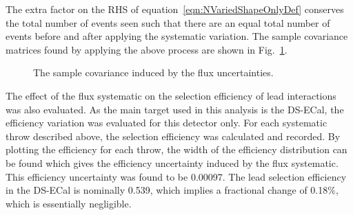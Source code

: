 The extra factor on the RHS of equation~\ref{eqn:NVariedShapeOnlyDef} conserves the total number of events seen such that there are an equal total number of events before and after applying the systematic variation.  The sample covariance matrices found by applying the above process are shown in Fig.~\ref{fig:FluxCovarianceMatrices}.
\begin{figure}%
  \centering
  \caption{The sample covariance induced by the flux uncertainties.}
  \label{fig:FluxCovarianceMatrices}
\end{figure}
\newline
\newline
The effect of the flux systematic on the selection efficiency of lead interactions was also evaluated.  As the main target used in this analysis is the DS-ECal, the efficiency variation was evaluated for this detector only.  For each systematic throw described above, the selection efficiency was calculated and recorded.  By plotting the efficiency for each throw, the width of the efficiency distribution can be found which gives the efficiency uncertainty induced by the flux systematic.  This efficiency uncertainty was found to be 0.00097.  The lead selection efficiency in the DS-ECal is nominally 0.539, which implies a fractional change of 0.18$\%$, which is essentially negligible.
